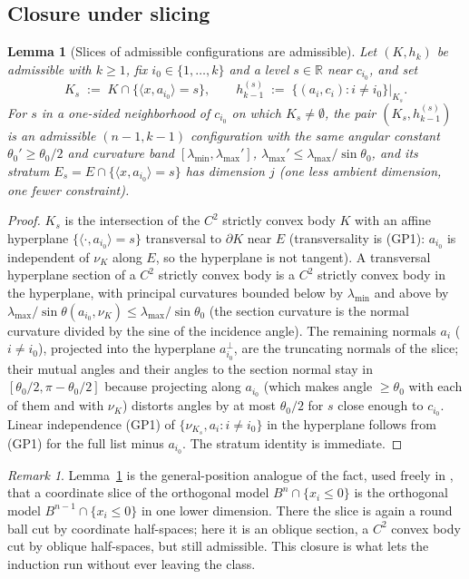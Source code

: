 \documentclass[11pt]{article}
\newtheorem{lemma}[theorem]{Lemma}
\theoremstyle{definition}
\theoremstyle{remark}
\newtheorem{remark}[theorem]{Remark}
\newcommand{\R}{\mathbb{R}}
\newcommand{\nor}{\nu_K}
\begin{document}
\subsection{Closure under slicing}

\begin{lemma}[Slices of admissible configurations are admissible]\label{lem:slice}
Let $(K,h_k)$ be admissible with $k\ge1$, fix $i_0\in\{1,\dots,k\}$ and a
level $s\in\R$ near $c_{i_0}$, and set
\[
K_s\;:=\;K\cap\{\langle x,a_{i_0}\rangle=s\},
\qquad
h_{k-1}^{(s)}\;:=\;\{(a_i,c_i):i\ne i_0\}\big|_{K_s}.
\]
For $s$ in a one-sided neighborhood of $c_{i_0}$ on which $K_s\ne\emptyset$,
the pair $(K_s,h_{k-1}^{(s)})$ is an admissible $(n-1,k-1)$ configuration with
the same angular constant $\theta_0'\ge\theta_0/2$ and curvature band
$[\lambda_{\min},\lambda_{\max}']$, $\lambda_{\max}'\le\lambda_{\max}/\sin
\theta_0$, and its stratum $E_s=E\cap\{\langle x,a_{i_0}\rangle=s\}$ has
dimension $j$ (one less ambient dimension, one fewer constraint).
\end{lemma}

\begin{proof}
$K_s$ is the intersection of the $C^2$ strictly convex body $K$ with an affine
hyperplane $\{\langle\cdot,a_{i_0}\rangle=s\}$ transversal to $\partial K$ near
$E$ (transversality is (GP1): $a_{i_0}$ is independent of $\nor$ along $E$, so
the hyperplane is not tangent).  A transversal hyperplane section of a $C^2$
strictly convex body is a $C^2$ strictly convex body in the hyperplane, with
principal curvatures bounded below by $\lambda_{\min}$ and above by
$\lambda_{\max}/\sin\theta(a_{i_0},\nor)\le\lambda_{\max}/\sin\theta_0$
(the section curvature is the normal curvature divided by the sine of the
incidence angle).  The remaining normals $a_i$ ($i\ne i_0$), projected into the
hyperplane $a_{i_0}^\perp$, are the truncating normals of the slice; their
mutual angles and their angles to the section normal stay in $[\theta_0/2,\pi
-\theta_0/2]$ because projecting along $a_{i_0}$ (which makes angle $\ge\theta_0$
with each of them and with $\nor$) distorts angles by at most $\theta_0/2$ for
$s$ close enough to $c_{i_0}$.  Linear independence (GP1) of
$\{\nu_{K_s},a_i:i\ne i_0\}$ in the hyperplane follows from (GP1) for the full
list minus $a_{i_0}$.  The stratum identity is immediate.
\end{proof}

\begin{remark}
Lemma~\ref{lem:slice} is the general-position analogue of the fact, used freely
in \cite{companion11}, that a coordinate slice of the orthogonal model
$B^n\cap\{x_i\le0\}$ is the orthogonal model $B^{n-1}\cap\{x_i\le0\}$ in one
lower dimension.  There the slice is again a round ball cut by coordinate
half-spaces; here it is an oblique section, a $C^2$ convex body cut by oblique
half-spaces, but still admissible.  This closure is what lets the induction run
without ever leaving the class.
\end{remark}
\end{document}
